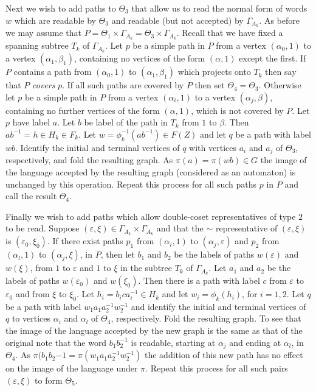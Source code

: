 \documentclass[a4paper,12pt]{article}
\renewcommand{\a}{\alpha }
\renewcommand{\b}{\beta }
\newcommand{\G}{\Gamma }
\newcommand{\e}{\varepsilon }
\newcommand{\T}{\Theta }
\numberwithin{equation}{section}
\numberwithin{figure}{section}
\begin{document}
Next we wish to add paths to $\T_3$ that allow us to read the normal
form of words $w$ which are readable by $\T_3$ and readable 
(but not accepted) by $\G_{A_k}$.  
As before we may assume that
$P=\T_1\times \G_{A_k}=
 \T_3\times \G_{A_k}$. 
Recall that we have fixed a spanning subtree 
$T_k$ of $\G_{A_k}$. Let $p$ be a simple path in $P$ from a 
vertex $(\a_0,1)$ to a vertex $(\a_1,\b_1)$, containing no
vertices of the form $(\a,1)$ except the first. If $P$ contains a 
path from $(\a_0,1)$ to $(\a_1,\b_1)$ which projects onto $T_k$ then
 say that $P$ {\em covers} $p$. 
If all such paths are covered by $P$ then set $\T_4=\T_3$.
Otherwise 
let $p$ be a simple path in $P$ from a  vertex $(\a_i,1)$ to a vertex $(\a_j,\b)$, containing no further
vertices of the form $(\a,1)$,
which is not covered by $P$.
 Let 
$p$ have label $a$.  
Let $b$ be label of the path in $T_k$ from $1$ to $\b$. 
Then $ab^{-1}=h\in H_k\in F_k$. Let 
$w=\phi_{k}^{-1}(ab^{-1})
\in F(Z)$ and let $q$ be a path with label $wb$. Identify the initial
and terminal vertices of $q$ with vertices $a_i$ and $a_j$ of $\T_3$, 
respectively, and fold
the resulting graph. 
As $\pi(a)=\pi(wb)\in G$ the image of the language accepted by
the resulting graph (considered as an automaton) is unchanged by
this operation. 
Repeat this process for all such paths $p$ in $P$ and 
call the result $\T_4$. 

Finally we wish to add paths which allow double-coset representatives
of type $2$ to be read. Suppose $(\e,\xi)\in \G_{A_k}\times \G_{A_k}$ and
that the $\sim$ representative of $(\e,\xi)$ is $(\e_0,\xi_0)$. If there
exist paths $p_1$ from $(\a_i,1)$ to $(\a_j,\e)$ and $p_2$ from
$(\a_l,1)$ to $(\a_j,\xi)$, in $P$,  then let $b_1$ and $b_2$ be the labels
of paths $w(\e)$ and $w(\xi)$, from $1$ to $\e$ and $1$ to $\xi$ in the
subtree $T_k$ of $\G_{A_k}$. Let $a_1$ and $a_2$ be the labels of 
paths $w(\e_0)$ and $w(\xi_0)$. Then there is a path with label 
$c$ from $\e$ to $\e_0$ and from $\xi$ to $\xi_0$. Let $h_i=
b_ica_i^{-1}\in H_k$ and let $w_i=\phi_k(h_i)$, for $i=1,2$. 
Let $q$ be a path with label $w_1 a_1a_2^{-1} w_2^{-1}$ 
and identify the initial
and terminal vertices of $q$ to  vertices $\a_i$ and $\a_l$
of $\T_4$, respectively. 
Fold the resulting graph. 
To see that the image of the language accepted by
 the new graph is the same as that of the original note
that the word $b_1b_2^{-1}$ is readable, starting at $\a_j$ and 
ending at $\a_l$, in $\T_4$. As $\pi(b_1b_2{-1}=\pi(w_1a_1a_2^{-1}w_2^{-1})$
the addition of this new path has no effect on the image of the language 
under $\pi$.  
Repeat this process for all such 
pairs $(\e,\xi)$ to form $\T_5$.    
\end{document}
